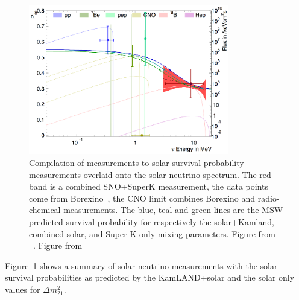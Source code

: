 \begin{figure}[htbp]
    \centering
    \includegraphics[width=0.78\textwidth]{sk_pee_global}
    \caption[Compilation of Solar Neutrino Measurements]{Compilation of measurements to solar survival probability measurements
    overlaid onto the solar neutrino spectrum. The red band is a combined
    SNO+SuperK measurement, the data points come from Borexino~\cite{borexino_final_results},
    the CNO limit combines Borexino and radio-chemical measurements. The blue, teal and green lines
    are the MSW predicted survival probability for respectively the solar+Kamland,
    combined solar, and Super-K only mixing parameters. Figure from ~\citep{superk4}.
    Figure from~\citep{superk4}}
    \label{fig:sk_pee_global}
\end{figure}

Figure~\ref{fig:sk_pee_global} shows a summary of solar neutrino measurements
with the solar survival probabilities as predicted by the KamLAND+solar and
the solar only values for $\Delta m^{2}_{21}$.

